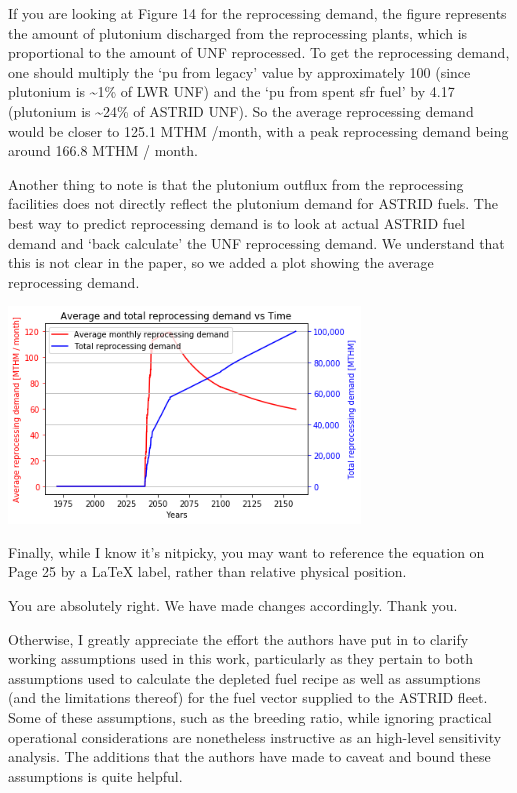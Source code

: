 \documentclass[answers,11pt]{exam}
\begin{document}
\begin{questions}
    \begin{solution}
        If you are looking at Figure 14 for the reprocessing demand, the figure
        represents the amount of plutonium discharged from the reprocessing plants,
        which is proportional to the amount of \gls{UNF} reprocessed. To get the
        reprocessing demand, one should multiply the `pu from legacy' value by
        approximately 100 (since plutonium is \textasciitilde 1\% of \gls{LWR} \gls{UNF})
        and the `pu from spent sfr fuel' by 4.17 (plutonium is \textasciitilde 24\% of
        ASTRID \gls{UNF}). So the average reprocessing demand would be closer to
        125.1 MTHM /month, with a peak reprocessing demand being around 166.8 MTHM / month.

        Another thing to note is that the plutonium outflux from the reprocessing facilities
        does not directly reflect the plutonium demand for ASTRID fuels. The best way to 
        predict reprocessing demand is to look at actual ASTRID fuel demand and `back calculate'
        the \gls{UNF} reprocessing demand. We understand that this is not clear in the paper,
        so we added a plot showing the average reprocessing demand.

        \centering
        \includegraphics[width=0.7\textwidth]{../images/french-transition/avg_tot_rep.png}

    \end{solution}

    \question Finally, while I know it's nitpicky, you may want to reference the equation on Page 25 by a LaTeX label, rather than relative physical position.

    \begin{solution}
    You are absolutely right. We have made changes accordingly.
    Thank you.
    \end{solution}

    \question Otherwise, I greatly appreciate the effort the authors have put in to clarify working assumptions used in this work,
    particularly as they pertain to both assumptions used to calculate the depleted fuel recipe as well as assumptions (and the limitations thereof)
    for the fuel vector supplied to the ASTRID fleet. Some of these assumptions, such as the breeding ratio,
    while ignoring practical operational considerations are nonetheless instructive as an high-level sensitivity analysis.
    The additions that the authors have made to caveat and bound these assumptions is quite helpful.


\end{questions}
\end{document}
